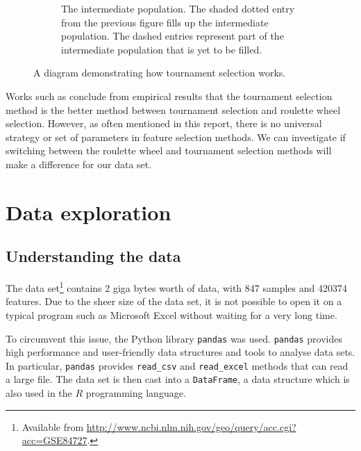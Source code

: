 \documentclass[12pt, twoside, a4paper]{report}
\begin{document}
\begin{figure}
\begin{subfigure}[b]{\textwidth}
\centering
{}
\caption{The intermediate population. The shaded dotted entry from the previous figure fills up the intermediate population. The dashed entries represent part of the intermediate population that is yet to be filled.}
\label{bg:ga:tour_b}
\end{subfigure}

\caption{A diagram demonstrating how tournament selection works.}
\label{bg:ga:tour}
\end{figure}

Works such as \cite{RefWorks:245, RefWorks:246} conclude from empirical results that the tournament selection method is the better method between tournament selection and roulette wheel selection. However, as often mentioned in this report, there is no universal strategy or set of parameters in feature selection methods. We can investigate if switching between the roulette wheel and tournament selection methods will make a difference for our data set.


\chapter{Data exploration}
\section{Understanding the data} \label{data:understanding}

The data set\footnote{Available from \url{http://www.ncbi.nlm.nih.gov/geo/query/acc.cgi?acc=GSE84727}.} contains 2 giga bytes worth of data, with 847 samples and 420374 features. Due to the sheer size of the data set, it is not possible to open it on a typical program such as Microsoft Excel without waiting for a very long time.

To circumvent this issue, the Python library \texttt{pandas} \cite{RefWorks:213} was used. \texttt{pandas} provides high performance and user-friendly data structures and tools to analyse data sets. In particular, \texttt{pandas} provides \texttt{read\_csv} and \texttt{read\_excel} methods that can read a large file. The data set is then cast into a \texttt{DataFrame}, a data structure which is also used in the $R$ programming language.
\end{document}
